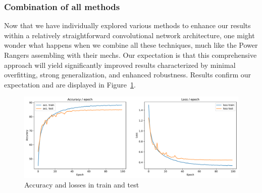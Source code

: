 \documentclass{article}
\theoremstyle{plain}%
\theoremstyle{definition}
\theoremstyle{remark}
\begin{document}
\subsubsection{Combination of all methods}
Now that we have individually explored various methods to enhance our results within a relatively straightforward convolutional network architecture, one might wonder what happens when we combine all these techniques, much like the Power Rangers assembling with their mechs. Our expectation is that this comprehensive approach will yield significantly improved results characterized by minimal overfitting, strong generalization, and enhanced robustness. Results confirm our expectation and are displayed in Figure~\ref{fig:combined}.

\begin{figure}[H]
    \centering
    \includegraphics*[width=\textwidth]{figs/CNN/combined.pdf}
    \caption{Accuracy and losses in train and test}
    \label{fig:combined}
\end{figure}
\end{document}
